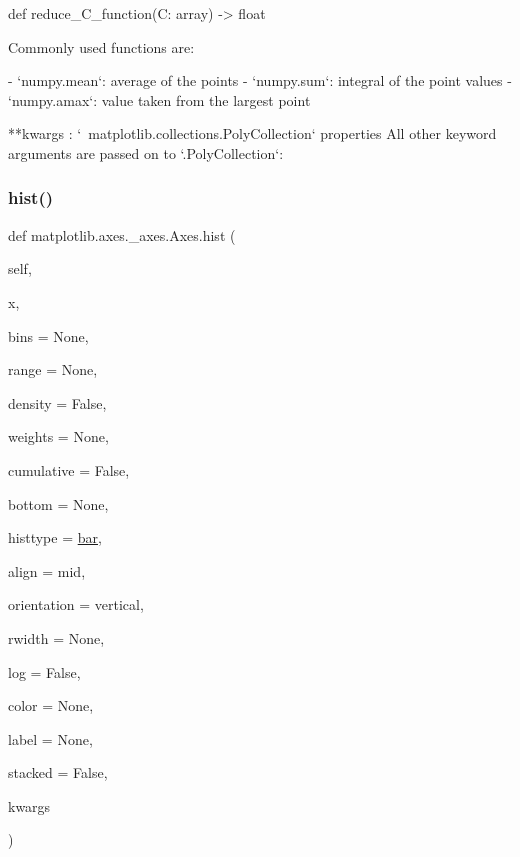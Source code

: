 \begin{DoxyVerb}
def reduce_C_function(C: array) -> float

    Commonly used functions are:

    - `numpy.mean`: average of the points
    - `numpy.sum`: integral of the point values
    - `numpy.amax`: value taken from the largest point

**kwargs : `~matplotlib.collections.PolyCollection` properties
    All other keyword arguments are passed on to `.PolyCollection`:

 \mbox{\label{classmatplotlib_1_1axes_1_1__axes_1_1Axes_a79df73fc4d90f29a635144051bc12d32}} 
\subsubsection{\texorpdfstring{hist()}{hist()}}
{\footnotesize\ttfamily def matplotlib.\+axes.\+\_\+axes.\+Axes.\+hist (\begin{DoxyParamCaption}\item[{}]{self,  }\item[{}]{x,  }\item[{}]{bins = {\ttfamily None},  }\item[{}]{range = {\ttfamily None},  }\item[{}]{density = {\ttfamily False},  }\item[{}]{weights = {\ttfamily None},  }\item[{}]{cumulative = {\ttfamily False},  }\item[{}]{bottom = {\ttfamily None},  }\item[{}]{histtype = {\ttfamily \textquotesingle{}\hyperlink{classmatplotlib_1_1axes_1_1__axes_1_1Axes_abedbbc828dec3e3c060e79b5cdb8aced}{bar}\textquotesingle{}},  }\item[{}]{align = {\ttfamily \textquotesingle{}mid\textquotesingle{}},  }\item[{}]{orientation = {\ttfamily \textquotesingle{}vertical\textquotesingle{}},  }\item[{}]{rwidth = {\ttfamily None},  }\item[{}]{log = {\ttfamily False},  }\item[{}]{color = {\ttfamily None},  }\item[{}]{label = {\ttfamily None},  }\item[{}]{stacked = {\ttfamily False},  }\item[{}]{kwargs }\end{DoxyParamCaption})}


\end{DoxyVerb}
